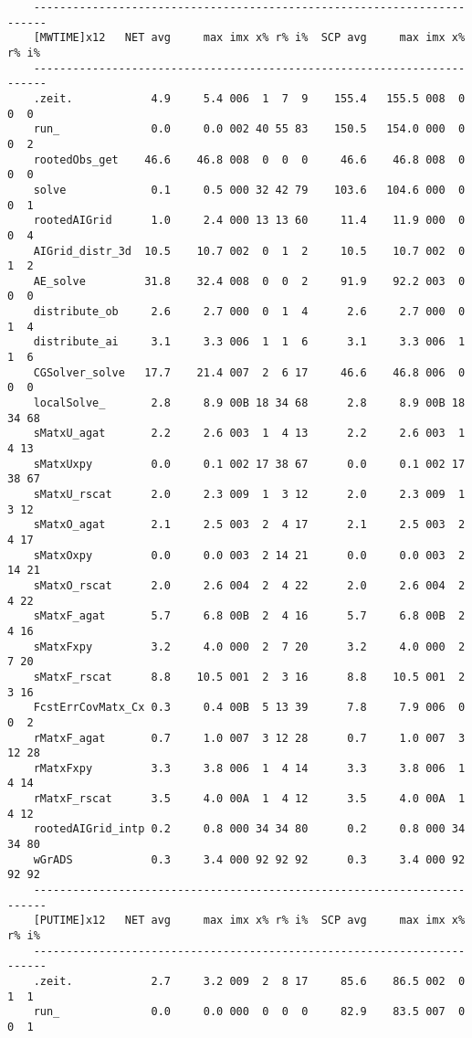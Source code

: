 \begin{verbatim}
    ------------------------------------------------------------------------
    [MWTIME]x12   NET avg     max imx x% r% i%  SCP avg     max imx x% r% i%
    ------------------------------------------------------------------------
    .zeit.            4.9     5.4 006  1  7  9    155.4   155.5 008  0  0  0
    run_              0.0     0.0 002 40 55 83    150.5   154.0 000  0  0  2
    rootedObs_get    46.6    46.8 008  0  0  0     46.6    46.8 008  0  0  0
    solve             0.1     0.5 000 32 42 79    103.6   104.6 000  0  0  1
    rootedAIGrid      1.0     2.4 000 13 13 60     11.4    11.9 000  0  0  4
    AIGrid_distr_3d  10.5    10.7 002  0  1  2     10.5    10.7 002  0  1  2
    AE_solve         31.8    32.4 008  0  0  2     91.9    92.2 003  0  0  0
    distribute_ob     2.6     2.7 000  0  1  4      2.6     2.7 000  0  1  4
    distribute_ai     3.1     3.3 006  1  1  6      3.1     3.3 006  1  1  6
    CGSolver_solve   17.7    21.4 007  2  6 17     46.6    46.8 006  0  0  0
    localSolve_       2.8     8.9 00B 18 34 68      2.8     8.9 00B 18 34 68
    sMatxU_agat       2.2     2.6 003  1  4 13      2.2     2.6 003  1  4 13
    sMatxUxpy         0.0     0.1 002 17 38 67      0.0     0.1 002 17 38 67
    sMatxU_rscat      2.0     2.3 009  1  3 12      2.0     2.3 009  1  3 12
    sMatxO_agat       2.1     2.5 003  2  4 17      2.1     2.5 003  2  4 17
    sMatxOxpy         0.0     0.0 003  2 14 21      0.0     0.0 003  2 14 21
    sMatxO_rscat      2.0     2.6 004  2  4 22      2.0     2.6 004  2  4 22
    sMatxF_agat       5.7     6.8 00B  2  4 16      5.7     6.8 00B  2  4 16
    sMatxFxpy         3.2     4.0 000  2  7 20      3.2     4.0 000  2  7 20
    sMatxF_rscat      8.8    10.5 001  2  3 16      8.8    10.5 001  2  3 16
    FcstErrCovMatx_Cx 0.3     0.4 00B  5 13 39      7.8     7.9 006  0  0  2
    rMatxF_agat       0.7     1.0 007  3 12 28      0.7     1.0 007  3 12 28
    rMatxFxpy         3.3     3.8 006  1  4 14      3.3     3.8 006  1  4 14
    rMatxF_rscat      3.5     4.0 00A  1  4 12      3.5     4.0 00A  1  4 12
    rootedAIGrid_intp 0.2     0.8 000 34 34 80      0.2     0.8 000 34 34 80
    wGrADS            0.3     3.4 000 92 92 92      0.3     3.4 000 92 92 92
    ------------------------------------------------------------------------
    [PUTIME]x12   NET avg     max imx x% r% i%  SCP avg     max imx x% r% i%
    ------------------------------------------------------------------------
    .zeit.            2.7     3.2 009  2  8 17     85.6    86.5 002  0  1  1
    run_              0.0     0.0 000  0  0  0     82.9    83.5 007  0  0  1

\end{verbatim}
